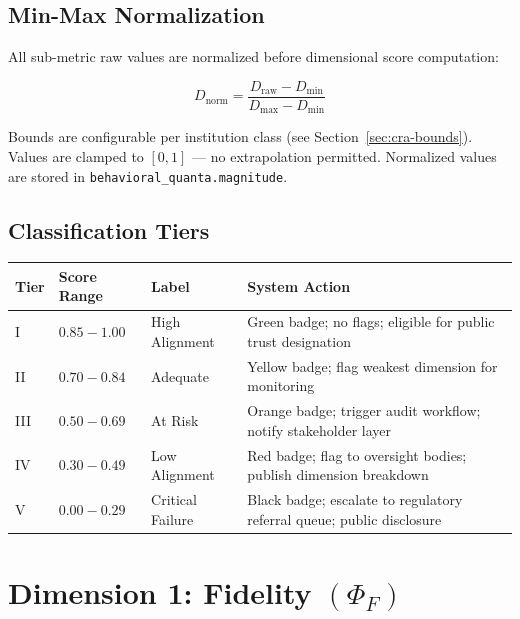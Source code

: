 \documentclass[a4paper,11pt]{article}
\begin{document}
	\subsection{Min-Max Normalization}
	
	All sub-metric raw values are normalized before dimensional score computation:
	
	\[
	D_{\text{norm}} = \frac{D_{\text{raw}} - D_{\min}}{D_{\max} - D_{\min}}
	\]
	
	Bounds are configurable per institution class (see Section~\ref{sec:cra-bounds}). Values are clamped to $[0, 1]$ — no extrapolation permitted. Normalized values are stored in \texttt{behavioral\_quanta.magnitude}.
	
	\subsection{Classification Tiers}
	
	\begin{center}
		\begin{tabular}{C{0.9cm} C{2.3cm} C{2.8cm} L{6.8cm}}
			\toprule
			\color{white}\textbf{\sffamily Tier} & \color{white}\textbf{\sffamily Score Range} & \color{white}\textbf{\sffamily Label} & \color{white}\textbf{\sffamily System Action} \\
			\midrule
			 I & $0.85 - 1.00$ & High Alignment & Green badge; no flags; eligible for public trust designation \\
			 II & $0.70 - 0.84$ & Adequate & Yellow badge; flag weakest dimension for monitoring \\
			 III & $0.50 - 0.69$ & At Risk & Orange badge; trigger audit workflow; notify stakeholder layer \\
			 IV & $0.30 - 0.49$ & Low Alignment & Red badge; flag to oversight bodies; publish dimension breakdown \\
			 V & $0.00 - 0.29$ & Critical Failure & Black badge; escalate to regulatory referral queue; public disclosure \\
			\bottomrule
		\end{tabular}
	\end{center}
	
	\newpage
	\section{Dimension 1: Fidelity \texorpdfstring{$(\Phi_F)$}{}}
	
\end{document}

